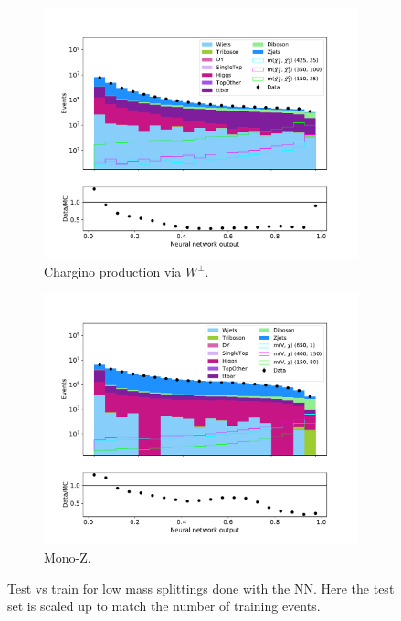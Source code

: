 \begin{figure}[H]
\begin{subfigure}[t!]{0.49\textwidth}
        \label{fig:SlepsnuNNLow}
    \end{subfigure}      
    \begin{subfigure}[t!]{0.49\textwidth}
        \includegraphics[width = \textwidth]{Figures/Stacked/stackedplot_NN_All_level_WW.pdf}
        \caption{Chargino production via $W^\pm$.}
        \label{fig:WWNNLow}
    \end{subfigure}
    \begin{subfigure}[t!]{0.49\textwidth}
        \includegraphics[width = \textwidth]{Figures/Stacked/stackedplot_NN_All_level_monoZ.pdf}
        \caption{Mono-Z.}
        \label{fig:MonoZNNLow}
    \end{subfigure}
    \caption{Test vs train for low mass splittings done with the NN. Here the test set is scaled up to match the number of training events.}
    \label{fig:AllLowNN}
\end{figure}
